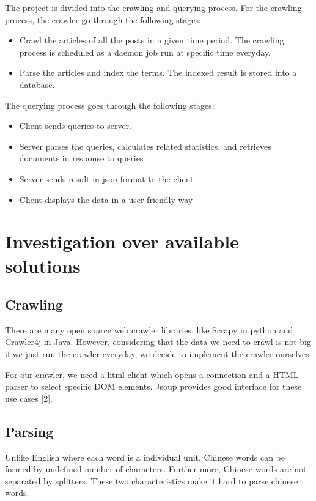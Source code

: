 \documentclass{article}
\begin{document}
The project is divided into the crawling and querying process. For the crawling process, the crawler go through the following stages:

\begin{itemize}
  \item Crawl the articles of all the posts in a given time period. The crawling process is scheduled as a daemon job run at specific time everyday. 
  \item Parse the articles and index the terms. The indexed result is stored into a database.
\end{itemize}

The querying process goes through the following stages:

\begin{itemize}
  \item Client sends queries to server.
  \item Server parses the queries, calculates related statistics, and retrieves documents in response to queries
  \item Server sends result in json format to the client
  \item Client displays the data in a user friendly way
\end{itemize}

\section{Investigation over available solutions}
\subsection{Crawling}
There are many open source web crawler libraries, like Scrapy in python and Crawler4j in Java. However, considering that the data we need to crawl is not big if we just run the crawler everyday, we decide to implement the crawler ourselves.

For our crawler, we need a html client which opens a connection and a HTML parser to select specific DOM elements. Jsoup provides good interface for these use cases [2].

\subsection{Parsing}
Unlike English where each word is a individual unit, Chinese words can be formed by undefined number of characters. Further more, Chinese words are not separated by splitters. These two characteristics make it hard to parse chinese words.
\end{document}
